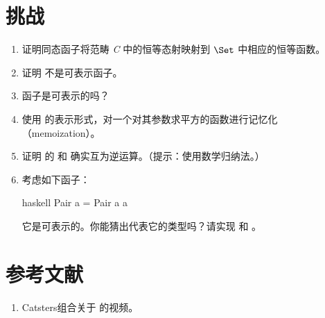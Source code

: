 \section{挑战}

\begin{enumerate}
  \tightlist
  \item
        证明同态函子将范畴 \emph{C} 中的恒等态射映射到 $\Set$ 中相应的恒等函数。
  \item
        证明  不是可表示函子。
  \item
         函子是可表示的吗？
  \item
        使用  的表示形式，对一个对其参数求平方的函数进行记忆化（memoization）。
  \item
        证明  的  和  确实互为逆运算。（提示：使用数学归纳法。）
  \item
        考虑如下函子：

        \begin{snip}{haskell}
Pair a = Pair a a
\end{snip}
        它是可表示的。你能猜出代表它的类型吗？请实现  和 。
\end{enumerate}

\section{参考文献}

\begin{enumerate}
  \tightlist
  \item
        Catsters组合关于
        的视频。
\end{enumerate}